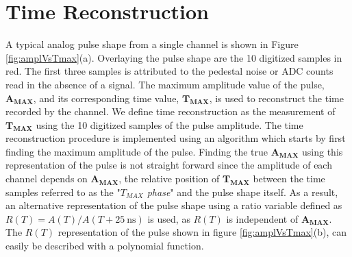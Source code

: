 \section{Time Reconstruction}
A typical analog pulse shape from a single channel is shown in Figure \ref{fig:amplVsTmax}(a). 
Overlaying the pulse shape are the 10 digitized  samples in red. 
The first three samples is attributed to the pedestal noise or ADC counts read in the absence of a signal. 
The maximum amplitude value of the pulse, $\mathbf{A_{MAX}}$, and its corresponding time value, $\mathbf{T_{MAX}}$, is used to reconstruct the time recorded by the channel. 
\newline
We define time reconstruction as the measurement of $\mathbf{T_{MAX}}$ using the 10 digitized samples of the pulse amplitude. The time reconstruction procedure is implemented using an algorithm which starts by first finding the maximum amplitude of the pulse. %
Finding the true $\mathbf{A_{MAX}}$ using this representation of the pulse is not straight forward since  the amplitude of each channel depends on $\mathbf{A_{MAX}}$, the relative position of $\mathbf{T_{MAX}}$ between the time samples referred to as the "\textit{$T_{MAX}$ phase}" and the pulse shape itself. As a result, an alternative representation of the pulse shape using a ratio variable defined as $R(T) = A(T)/ A(T + 25~\mbox{ns})$ is used, as $R(T)$ is independent of $\mathbf{A_{MAX}}$.
The $ R(T)$ representation of the pulse shown in figure \ref{fig:amplVsTmax}(b), can easily be described with a polynomial function. %


